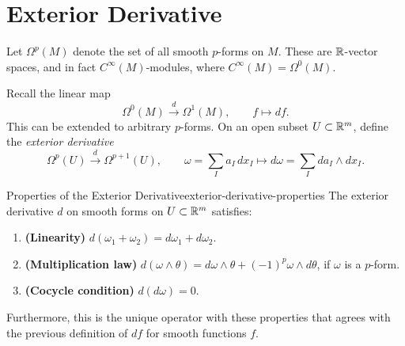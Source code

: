 
\section{Exterior Derivative}

Let $\Omega^p(M)$ denote the set of all smooth $p$-forms on $M$. These are $\mathbb{R}$-vector spaces, and in fact $C^\infty(M)$-modules, where $C^\infty(M) = \Omega^0(M)$.

Recall the linear map
\[
    \Omega^0(M) \xrightarrow{d} \Omega^1(M), \qquad f \mapsto df.
\]
This can be extended to arbitrary $p$-forms. On an open subset $U \subset \mathbb{R}^m$, define the \emph{exterior derivative}
\[
    \Omega^p(U) \xrightarrow{d} \Omega^{p+1}(U), \qquad \omega = \sum_I a_I\, dx_I \mapsto d\omega = \sum_I da_I \wedge dx_I.
\]

\begin{theorem}{Properties of the Exterior Derivative}{exterior-derivative-properties}
    The exterior derivative $d$ on smooth forms on $U \subset \mathbb{R}^m$ satisfies:
    \begin{enumerate}[label=(\alph*)]
        \item \textbf{(Linearity)} $d(\omega_1 + \omega_2) = d\omega_1 + d\omega_2$.
        \item \textbf{(Multiplication law)} $d(\omega \wedge \theta) = d\omega \wedge \theta + (-1)^p \omega \wedge d\theta$, if $\omega$ is a $p$-form.
        \item \textbf{(Cocycle condition)} $d(d\omega) = 0$.
    \end{enumerate}
    Furthermore, this is the unique operator with these properties that agrees with the previous definition of $df$ for smooth functions $f$.
\end{theorem}

